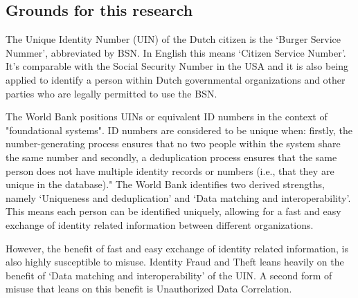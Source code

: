 \subsection{Grounds for this research}
The Unique Identity Number (UIN) of the Dutch citizen is the ‘Burger Service Nummer’, abbreviated by BSN. In English this means ‘Citizen Service Number’. It’s comparable with the Social Security Number in the USA and it is also being applied to identify a person within Dutch governmental organizations and other parties who are legally permitted to use the BSN. \par
The World Bank \cite{WorldBank_UIN} positions UINs or equivalent ID numbers in the context of "foundational systems". ID numbers are considered to be unique when: firstly, the number-generating process ensures that no two people within the system share the same number and secondly, a deduplication process ensures that the same person does not have multiple identity records or numbers (i.e., that they are unique in the database)." The World Bank identifies two derived strengths, namely ‘Uniqueness and deduplication’ and ‘Data matching and interoperability’. This means each person can be identified uniquely, allowing for a fast and easy exchange of identity related information between different organizations.\par 
However, the benefit of fast and easy exchange of identity related information, is also highly susceptible to misuse. Identity Fraud and Theft leans heavily on the benefit of ‘Data matching and interoperability’ of the UIN. A second form of misuse that leans on this benefit is Unauthorized Data Correlation. \par
